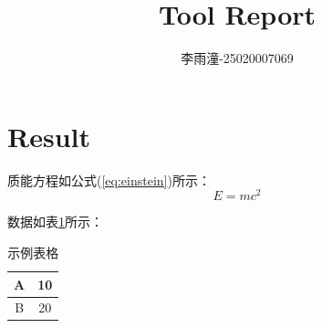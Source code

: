 \documentclass{article}
\begin{document}
\title{\textbf{Tool Report}}
\author{李雨潼-25020007069}
\maketitle

\section{Result}
质能方程如公式(\ref{eq:einstein})所示：
\begin{equation}
    E = mc^2 \label{eq:einstein}
\end{equation}

数据如表\ref{tab:example}所示：
\begin{table}[h]
    \centering
    \begin{tabular}{|c|c|}
        \hline
        A & 10 \\
        \hline
        B & 20 \\
        \hline
    \end{tabular}
    \caption{示例表格}
    \label{tab:example}
\end{table}
\end{document}
